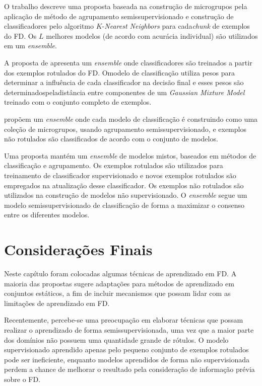 O trabalho \cite{Masud2008} descreve uma proposta baseada na construção de microgrupos pela aplicação de método de agrupamento semissupervisionado e construção de classificadores pelo algoritmo $K$-\emph{Nearest Neighbors} para cada\emph{chunk} de exemplos do FD. Os $L$ melhores modelos (de acordo com acurácia individual) são utilizados em um \emph{ensemble}.

A proposta de  apresenta um \emph{ensemble} onde classificadores são treinados a partir dos exemplos rotulados do FD. Omodelo de classificação utiliza pesos para determinar a influência de cada classificador na decisão final e esses pesos são determinadospeladistância entre componentes de um \emph{Gaussian Mixture Model} treinado com o conjunto completo de exemplos.

 propõem um \emph{ensemble} onde cada modelo de classificação é construindo como uma coleção de microgrupos, usando agrupamento semissupervisionado, e exemplos não rotulados são classificados de acordo com o conjunto de modelos. 

Uma proposta \cite{Liu2013} mantém um \emph{ensemble} de modelos mistos, baseados em métodos de classificação e agrupamento. Os exemplos rotulados são utilizados para treinamento de classificador supervisionado e novos exemplos rotulados são empregados na atualização desse classificador. Os exemplos não rotulados são utilizados na construção de modelos não supervisionado. O \emph{ensemble} segue um modelo semissupervisionado de classificação de forma a maximizar o consenso entre os diferentes modelos.

\section{Considerações Finais}

Neste capítulo foram colocadas algumas técnicas de aprendizado em FD. A maioria das propostas sugere adaptações para métodos de aprendizado em conjuntos estáticos, a fim de incluir mecanismos que possam lidar com as limitações de aprendizado em FD.

Recentemente, percebe-se uma preocupação em elaborar técnicas que possam realizar o aprendizado de forma semissupervisionada, uma vez que a maior parte dos domínios não possuem uma quantidade grande de rótulos. O modelo supervisionado aprendido apenas pelo pequeno conjunto de exemplos rotulados pode ser ineficiente, enquanto modelos aprendidos de forma não supervisionada perdem a chance de melhorar o resultado pela consideração de informação prévia sobre o FD.

